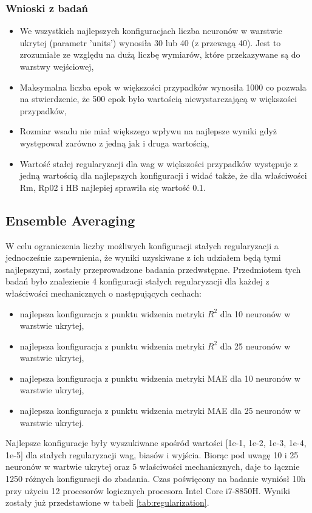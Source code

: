\FloatBarrier

\subsubsection{Wnioski z badań}
\begin{itemize}
    \item We wszystkich najlepszych konfiguracjach liczba neuronów w warstwie ukrytej (parametr 'units') wynosiła 30 lub 40 (z przewagą 40). Jest to zrozumiałe ze względu na dużą liczbę wymiarów, które przekazywane są do warstwy wejściowej,
    \item Maksymalna liczba epok w większości przypadków wynosiła 1000 co pozwala na stwierdzenie, że 500 epok było wartością niewystarczającą w większości przypadków,
    \item Rozmiar wsadu nie miał większego wpływu na najlepsze wyniki gdyż występował zarówno z jedną jak i druga wartością, 
    \item Wartość stałej regularyzacji dla wag w większości przypadków występuje z jedną wartością dla najlepszych konfiguracji i widać także, że dla właściwości Rm, Rp02 i HB najlepiej sprawiła się wartość 0.1.
\end{itemize}


\subsection{Ensemble Averaging}\label{sec:ea-eval}
W celu ograniczenia liczby możliwych konfiguracji stałych regularyzacji a jednocześnie zapewnienia, że wyniki uzyskiwane z ich udziałem będą tymi najlepszymi, zostały przeprowadzone badania przedwstępne. Przedmiotem tych badań było znalezienie 4 konfiguracji stałych regularyzacji dla każdej z właściwości mechanicznych o następujących cechach:
\begin{itemize}
    \item najlepsza konfiguracja z punktu widzenia metryki $R^{2}$ dla 10 neuronów w warstwie ukrytej,
    \item najlepsza konfiguracja z punktu widzenia metryki $R^{2}$ dla 25 neuronów w warstwie ukrytej,
    \item najlepsza konfiguracja z punktu widzenia metryki MAE dla 10 neuronów w warstwie ukrytej,
    \item najlepsza konfiguracja z punktu widzenia metryki MAE dla 25 neuronów w warstwie ukrytej.
\end{itemize}
Najlepsze konfiguracje były wyszukiwane spośród wartości [1e-1, 1e-2, 1e-3, 1e-4, 1e-5] dla stałych regularyzacji wag, biasów i wyjścia. Biorąc pod uwagę 10 i 25 neuronów w wartwie ukrytej oraz 5 właściwości mechanicznych, daje to łącznie 1250 różnych konfiguracji do zbadania. Czas poświęcony na badanie wyniósł 10h przy użyciu 12 procesorów logicznych procesora Intel Core i7-8850H. Wyniki zostały już przedstawione w tabeli \ref{tab:regularization}.

